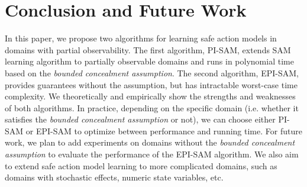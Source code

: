 \documentclass[letterpaper]{article} %
\newcommand{\roni}[1]{{\textcolor{green}{[Roni: #1]}}}
\begin{document}
\section{Conclusion and Future Work}
In this paper, we propose two algorithms for learning safe action models in domains with partial observability. The first algorithm, PI-SAM, extends SAM learning algorithm \cite{juba2021safe} to partially observable domains and runs in polynomial time based on the \textit{bounded concealment assumption}. The second algorithm, EPI-SAM, provides guarantees without the assumption, but has intractable worst-case time complexity. We theoretically and empirically show the strengths and weaknesses of both algorithms. In practice, depending on the specific domain (i.e. whether it satisfies the \textit{bounded concealment assumption} or not), we can choose either PI-SAM or EPI-SAM to optimize between performance and running time. For future work, we plan to add experiments on domains without the \textit{bounded concealment assumption} to evaluate the performance of the EPI-SAM algorithm. We also aim to extend safe action model learning to more complicated domains, such as domains with stochastic effects, numeric state variables, etc. 



\end{document}
